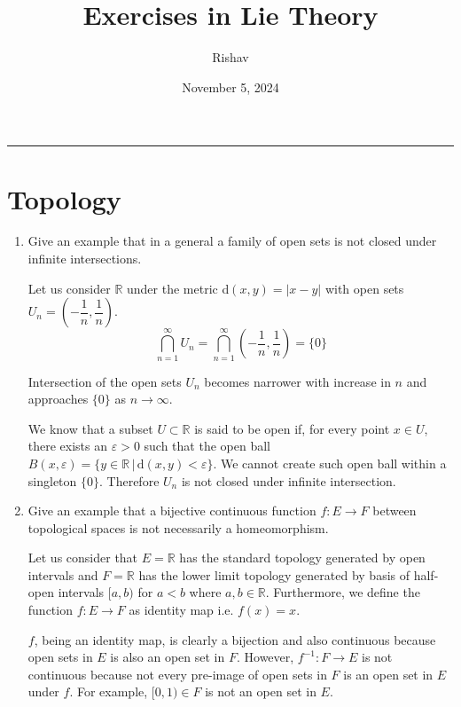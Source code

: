 \documentclass{article}
\title{Exercises in Lie Theory}
\date{November 5, 2024}
\author{Rishav}
\begin{document}
\maketitle
\hrule
\tableofcontents
\newpage

\section{Topology}

\begin{enumerate}
  \item Give an example that in a general a family of open sets is not closed under infinite intersections.

  \begin{ans_box}
    Let us consider $\mathbb{R}$ under the metric d$(x,y)=|x-y|$ with open sets $U_{n}=\left(-\dfrac{1}{n},\dfrac{1}{n}\right)$.
    $$
    \bigcap_{n=1}^{\infty}U_{n}=\bigcap_{n=1}^{\infty}\left(-\dfrac{1}{n},\dfrac{1}{n}\right)=\{0\}
    $$

  Intersection of the open sets $U_{n}$ becomes narrower with increase in $n$ and approaches $\{0\}$ as $n\rightarrow\infty$.\medskip

  We know that a subset $U\subset\mathbb{R}$ is said to be open if, for every point $x\in U$, there exists an $\varepsilon>0$ such that the open ball $B(x,\varepsilon)=\{y\in\mathbb{R}\,|\,\text{d}(x,y)<\varepsilon\}$. We cannot create such open ball within a singleton $\{0\}$. Therefore $U_{n}$ is not closed under infinite intersection.
  \end{ans_box}

  \item Give an example that a bijective continuous function $f:E\rightarrow F$ between topological spaces is not necessarily a homeomorphism.

  \begin{ans_box}
    Let us consider that $E=\mathbb{R}$ has the standard topology generated by open intervals and $F=\mathbb{R}$ has the lower limit topology generated by basis of half-open intervals $[a,b)$ for $a<b$ where $a,b\in\mathbb{R}$. Furthermore, we define the function $f:E\rightarrow F$ as identity map i.e. $f(x)=x$.\medskip

  $f$, being an identity map, is clearly a bijection and also continuous because open sets in $E$ is also an open set in $F$. However, $f^{-1}:F\rightarrow E$ is not continuous because not every pre-image of open sets in $F$ is an open set in $E$ under $f$. For example, $[0,1)\in F$ is not an open set in $E$.
  \end{ans_box}


\end{enumerate}
\end{document}

